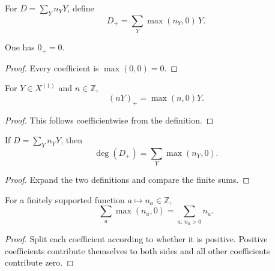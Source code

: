 \begin{definition}
  \label{mk-def:WeilDivisor_positivePart}
  \leanok


  For \(D=\sum_Y n_YY\), define
  \[
    D_+=\sum_Y\max(n_Y,0)\,Y.
  \]
\end{definition}

\begin{lemma}
  \label{mk-lem:positivePart_zero}
  \leanok

  One has \(0_+=0\).
\end{lemma}
\begin{proof}
  \leanok
  Every coefficient is \(\max(0,0)=0\).
\end{proof}

\begin{lemma}
  \label{mk-lem:positivePart_single}
  \leanok

  For \(Y\in X^{(1)}\) and \(n\in\mathbb Z\),
  \[
    (nY)_+=\max(n,0)Y.
  \]
\end{lemma}
\begin{proof}
  \leanok
  This follows coefficientwise from the definition.
\end{proof}

\begin{lemma}
  \label{mk-lem:degree_positivePart_eq_sum_max}
  \leanok

  If \(D=\sum_Yn_YY\), then
  \[
    \deg(D_+)=\sum_Y\max(n_Y,0).
  \]
\end{lemma}
\begin{proof}
  \leanok
  Expand the two definitions and compare the finite sums.
\end{proof}

\begin{lemma}
  \label{mk-lem:finsupp_sum_max_zero_eq_sum_filter_pos}
  \leanok

  For a finitely supported function \(a\mapsto n_a\in\mathbb Z\),
  \[
    \sum_a\max(n_a,0)=\sum_{a:\,n_a>0}n_a.
  \]
\end{lemma}
\begin{proof}
  \leanok
  Split each coefficient according to whether it is positive.  Positive
  coefficients contribute themselves to both sides and all other
  coefficients contribute zero.
\end{proof}

